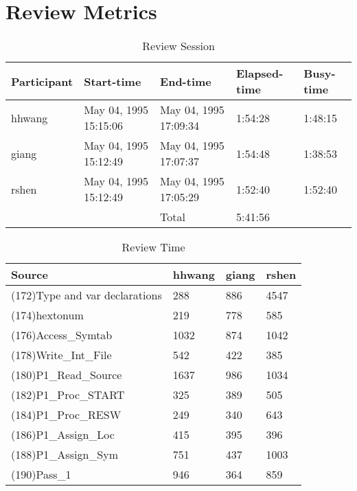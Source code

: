 \section{Review Metrics}
\begin{table}[hb]
\begin{center}
\begin{tabular}{|l|l|l|l|l|}
\hline
Participant & Start-time & End-time & Elapsed-time & Busy-time \\
\hline
hhwang & May 04, 1995 15:15:06 & May 04, 1995 17:09:34 & 1:54:28 & 1:48:15 \\
giang & May 04, 1995 15:12:49 & May 04, 1995 17:07:37 & 1:54:48 & 1:38:53 \\
rshen & May 04, 1995 15:12:49 & May 04, 1995 17:05:29 & 1:52:40 & 1:52:40 \\
\hline
 & & Total & 5:41:56 & \\
\hline
\end{tabular}
\end{center}
\caption{Review Session}
\end{table}


\begin{table}[hb]
\begin{center}
\begin{tabular}{|l|l|l|l|}
\hline
Source & hhwang & giang & rshen\\
\hline
(172)Type and var declarations & 288 & 886 & 4547\\
(174)hextonum & 219 & 778 & 585\\
(176)Access\_Symtab & 1032 & 874 & 1042\\
(178)Write\_Int\_File & 542 & 422 & 385\\
(180)P1\_Read\_Source & 1637 & 986 & 1034\\
(182)P1\_Proc\_START & 325 & 389 & 505\\
(184)P1\_Proc\_RESW & 249 & 340 & 643\\
(186)P1\_Assign\_Loc & 415 & 395 & 396\\
(188)P1\_Assign\_Sym & 751 & 437 & 1003\\
(190)Pass\_1 & 946 & 364 & 859\\
\hline
\end{tabular}
\end{center}
\caption{Review Time}
\end{table}

